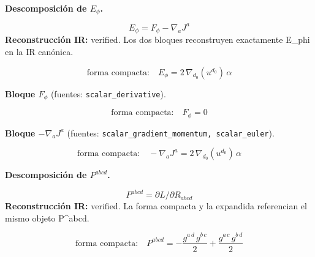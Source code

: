 \documentclass[11pt]{article}
\begin{document}
\par\medskip\noindent\textbf{Descomposición de $ E_{\phi} $.}\par
\begin{dmath*}[breakdepth={5}]
E_{\phi}=F_{\phi}-\nabla_aJ^a
\end{dmath*}
\textbf{Reconstrucción IR:} verified. Los dos bloques reconstruyen exactamente E\_phi en la IR canónica.\par
\begin{dmath*}[breakdepth={5}]
\text{forma compacta:}\quad E_{\phi} = 2\,\nabla_{d_{0}}\!\left(u{}^{d_{0}}\right)\,\alpha
\end{dmath*}
\par\smallskip\noindent\textbf{Bloque $ F_{\phi} $} (fuentes: \texttt{scalar\_derivative}).\par
\begin{dmath*}[breakdepth={5}]
\text{forma compacta:}\quad F_{\phi} = 0
\end{dmath*}
\par\smallskip\noindent\textbf{Bloque $ -\nabla_a J^a $} (fuentes: \texttt{scalar\_gradient\_momentum, scalar\_euler}).\par
\begin{dmath*}[breakdepth={5}]
\text{forma compacta:}\quad -\nabla_a J^a = 2\,\nabla_{d_{0}}\!\left(u{}^{d_{0}}\right)\,\alpha
\end{dmath*}
\par\medskip\noindent\textbf{Descomposición de $ P^{abcd} $.}\par
\begin{dmath*}[breakdepth={5}]
P^{abcd}=\partial L/\partial R_{abcd}
\end{dmath*}
\textbf{Reconstrucción IR:} verified. La forma compacta y la expandida referencian el mismo objeto P^{abcd}.\par
\begin{dmath*}[breakdepth={5}]
\text{forma compacta:}\quad P^{abcd} = -\frac{g{}^{a\,d}\,g{}^{b\,c}}{2} + \frac{g{}^{a\,c}\,g{}^{b\,d}}{2}
\end{dmath*}
\end{document}
